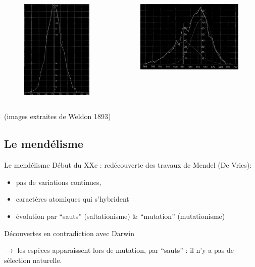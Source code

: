 \documentclass[8pt]{beamer}
\begin{document}
\begin{frame}{}
	\begin{columns}
	\begin{figure}[hbp]
		\begin{center}
			\includegraphics[width=4cm]{images/gauss1.png}
		\end{center}
	\end{figure}


	\begin{figure}[hbp]
		\begin{center}
			\includegraphics[width=6cm]{images/gauss2.png}
		\end{center}
	\end{figure}
\end{columns}
\begin{center}
	(images extraites de Weldon 1893)
\end{center}

\end{frame}


\subsection{Le mendélisme}
\begin{frame}{Le mendélisme}
	Début du XXe : redécouverte des travaux de Mendel (De Vries):
	\vfill
	\begin{itemize}
		\item pas de variations continues,
		\item caractères atomiques qui s'hybrident
		\item évolution par ``sauts'' (saltationisme) \& ``mutation'' (mutationisme)
	\end{itemize}
	\vfill

	Découvertes en contradiction avec Darwin

	$\rightarrow$ les espèces apparaissent lors de mutation, par ``sauts'' : il n'y a pas de sélection naturelle.

	
\end{frame}
\end{document}
